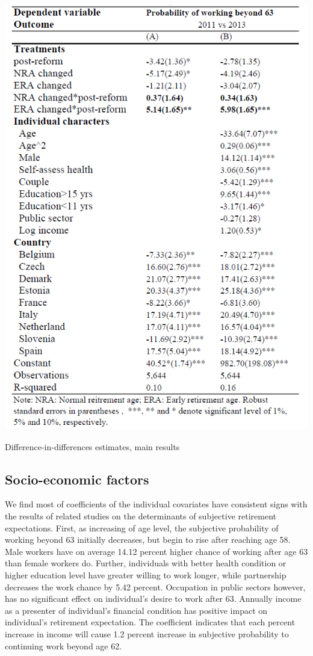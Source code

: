 \documentclass[a4paper]{article}
\begin{document}
\begin{table}[h] 
    \centering
    \includegraphics[width=0.7\linewidth]{table3.png}
    \caption{Difference-in-differences estimates, main results}
    \label{3}
\end{table}

\subsection{Socio-economic factors}

We find most of coefficients of the individual covariates have consistent signs with the results of related studies on the determinants of subjective retirement expectations. First, as increasing of age level, the subjective probability of working beyond 63 initially decreases, but begin to rise after reaching age 58. Male workers have on average 14.12 percent higher chance of working after age 63 than female workers do. Further, individuals with better health condition or higher education level have greater willing to work longer, while partnership decreases the work chance by 5.42 percent. Occupation in public sectors however, has no significant effect on individual’s desire to work after 63. Annually income as a presenter of individual’s financial condition has positive impact on individual’s retirement expectation. The coefficient indicates that each percent increase in income will cause 1.2 percent increase in subjective probability to continuing work beyond age 62. 
\end{document}
